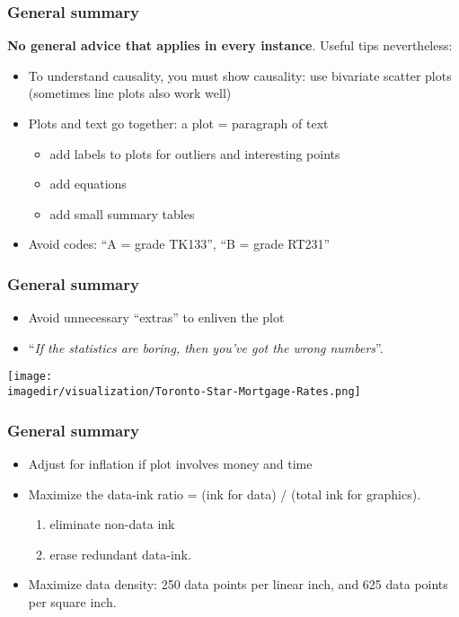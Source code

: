 \begin{frame}\frametitle{General summary}
	
	\textbf{No general advice that applies in every instance}. Useful tips nevertheless:
	\begin{itemize}
		\item	To understand causality, you must show causality: use bivariate scatter plots (sometimes line plots also work well) 
		\item	Plots and text go together: a plot = paragraph of text 
		\begin{itemize}
			\item	add labels to plots for outliers and interesting points 
			\item	add equations 
			\item	add small summary tables 
		\end{itemize}
		\item	Avoid codes: ``A = grade TK133'', ``B = grade RT231'' 
	\end{itemize}
\end{frame}

\begin{frame}\frametitle{General summary}
	\begin{itemize}
		\item	Avoid unnecessary ``extras'' to enliven the plot 
		\item	``\emph{If the statistics are boring, then you've got the wrong numbers}''. 
	\end{itemize}
	\begin{center}
		\texttt{[image: \\imagedir/visualization/Toronto-Star-Mortgage-Rates.png]}
	\end{center}
\end{frame}

\begin{frame}\frametitle{General summary}
	\begin{itemize}
		\item	Adjust for inflation if plot involves money and time 
		\item	Maximize the data-ink ratio = (ink for data) / (total ink for graphics). 
		\begin{enumerate}
			\item	eliminate non-data ink 
			\item	erase redundant data-ink. 
		\end{enumerate}
		\item	Maximize data density: 250 data points per linear inch, and 625 data points per square inch. 
	\end{itemize}
\end{frame}